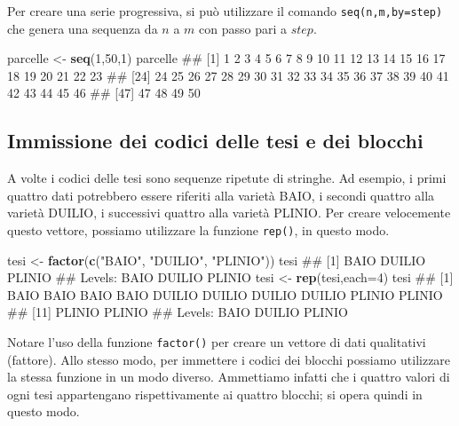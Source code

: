 \documentclass[a4paper,12pt,oneside]{book}
\newenvironment{Shaded}{\begin{snugshade}}{\end{snugshade}}
\newcommand{\KeywordTok}[1]{\textcolor[rgb]{0.13,0.29,0.53}{\textbf{#1}}}
\newcommand{\DataTypeTok}[1]{\textcolor[rgb]{0.13,0.29,0.53}{#1}}
\newcommand{\DecValTok}[1]{\textcolor[rgb]{0.00,0.00,0.81}{#1}}
\newcommand{\StringTok}[1]{\textcolor[rgb]{0.31,0.60,0.02}{#1}}
\newcommand{\NormalTok}[1]{#1}
\theoremstyle{definition}
\theoremstyle{definition}
\theoremstyle{definition}
\theoremstyle{remark}
\begin{document}
Per creare una serie progressiva, si può utilizzare il comando
\texttt{seq(n,m,by=step)} che genera una sequenza da \(n\) a \(m\) con
passo pari a \(step\).

\begin{Shaded}
\begin{Highlighting}[]
\NormalTok{parcelle  <-}\StringTok{  }\KeywordTok{seq}\NormalTok{(}\DecValTok{1}\NormalTok{,}\DecValTok{50}\NormalTok{,}\DecValTok{1}\NormalTok{)}
\NormalTok{parcelle}
\NormalTok{##  [1]  1  2  3  4  5  6  7  8  9 10 11 12 13 14 15 16 17 18 19 20 21 22 23}
\NormalTok{## [24] 24 25 26 27 28 29 30 31 32 33 34 35 36 37 38 39 40 41 42 43 44 45 46}
\NormalTok{## [47] 47 48 49 50}
\end{Highlighting}
\end{Shaded}

\subsection*{Immissione dei codici delle tesi e dei
blocchi}\label{immissione-dei-codici-delle-tesi-e-dei-blocchi}

A volte i codici delle tesi sono sequenze ripetute di stringhe. Ad
esempio, i primi quattro dati potrebbero essere riferiti alla varietà
BAIO, i secondi quattro alla varietà DUILIO, i successivi quattro alla
varietà PLINIO. Per creare velocemente questo vettore, possiamo
utilizzare la funzione \texttt{rep()}, in questo modo.

\begin{Shaded}
\begin{Highlighting}[]
\NormalTok{tesi  <-}\StringTok{  }\KeywordTok{factor}\NormalTok{(}\KeywordTok{c}\NormalTok{(}\StringTok{"BAIO"}\NormalTok{, }\StringTok{"DUILIO"}\NormalTok{, }\StringTok{"PLINIO"}\NormalTok{))}
\NormalTok{tesi}
\NormalTok{## [1] BAIO   DUILIO PLINIO}
\NormalTok{## Levels: BAIO DUILIO PLINIO}
\NormalTok{tesi  <-}\StringTok{  }\KeywordTok{rep}\NormalTok{(tesi,}\DataTypeTok{each=}\DecValTok{4}\NormalTok{)}
\NormalTok{tesi}
\NormalTok{##  [1] BAIO   BAIO   BAIO   BAIO   DUILIO DUILIO DUILIO DUILIO PLINIO PLINIO}
\NormalTok{## [11] PLINIO PLINIO}
\NormalTok{## Levels: BAIO DUILIO PLINIO}
\end{Highlighting}
\end{Shaded}

Notare l'uso della funzione \texttt{factor()} per creare un vettore di
dati qualitativi (fattore). Allo stesso modo, per immettere i codici dei
blocchi possiamo utilizzare la stessa funzione in un modo diverso.
Ammettiamo infatti che i quattro valori di ogni tesi appartengano
rispettivamente ai quattro blocchi; si opera quindi in questo modo.
\end{document}
